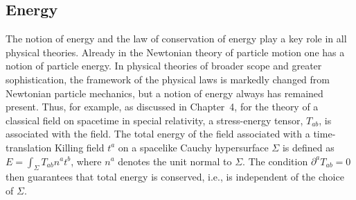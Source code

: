 
\subsection{Energy}\label{sec:11.2}

The notion of energy and the law of conservation of energy play a key role in all
physical theories. Already in the Newtonian theory of particle motion one has a
notion of particle energy. In physical theories of broader scope and greater
sophistication, the framework of the physical laws is markedly changed from
Newtonian particle mechanics, but a notion of energy always has remained present.
Thus, for example, as discussed in Chapter~4, for the theory of a classical field on
spacetime in special relativity, a stress-energy tensor, \(T_{ab}\), is associated with
the field. The total energy of the field associated with a time-translation Killing
field \(t^a\) on a spacelike Cauchy hypersurface \(\Sigma\) is defined as
\(E=\int_\Sigma T_{ab}n^at^b\), where \(n^a\) denotes the unit normal to
\(\Sigma\). The condition \(\partial^aT_{ab}=0\) then guarantees that total energy is
conserved, i.e., is independent of the choice of \(\Sigma\).

